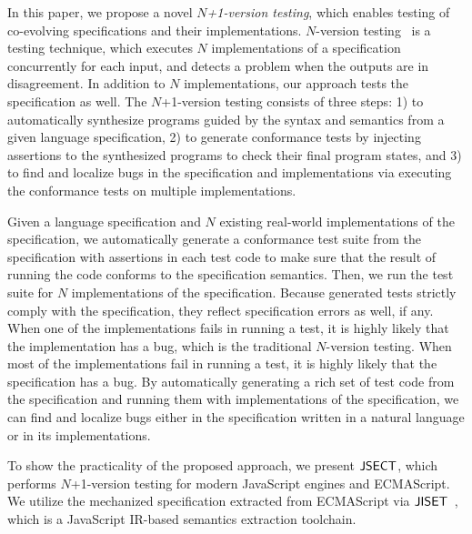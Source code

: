 In this paper, we propose a novel \textit{$N$+1-version testing},
which enables testing of co-evolving specifications and their implementations.
$N$-version testing~\cite{nversion} is a testing technique, which
executes $N$ implementations of a specification concurrently for each
input, and detects a problem when the outputs are in disagreement.
In addition to $N$ implementations, our approach tests the
specification as well.  The $N$+1-version testing
consists of three steps: 1) to automatically synthesize
programs guided by the syntax and semantics from a given language
specification, 2) to generate conformance tests by injecting
assertions to the synthesized programs
to check their final program states, and 3) to find and localize bugs in
the specification and implementations via executing the conformance tests on multiple implementations.

Given a language specification and $N$ existing real-world
implementations of the specification, we
automatically generate a conformance test suite from the specification with
assertions in each test code to make sure that the result of running the code
conforms to the specification semantics.  Then, we run the test suite for $N$
implementations of the specification.  Because generated tests strictly comply
with the specification, they reflect specification errors as well, if any.  When
one of the implementations fails in running a test, it is highly likely that the
implementation has a bug, which is the traditional $N$-version testing.  When
most of the implementations fail in running a test, it is highly likely that
the specification has a bug.  By automatically generating a rich set of test
code from the specification and running them with implementations of the
specification, we can find and localize bugs either in the specification written
in a natural language or in its implementations.

To show the practicality of the proposed approach, we present $\text{\sf JSECT}$,
which performs $N$+1-version testing for modern
JavaScript engines and ECMAScript.  We utilize the mechanized specification
extracted from ECMAScript via $\text{\sf JISET}$~\cite{jiset}, which is a JavaScript
IR-based semantics extraction toolchain.

